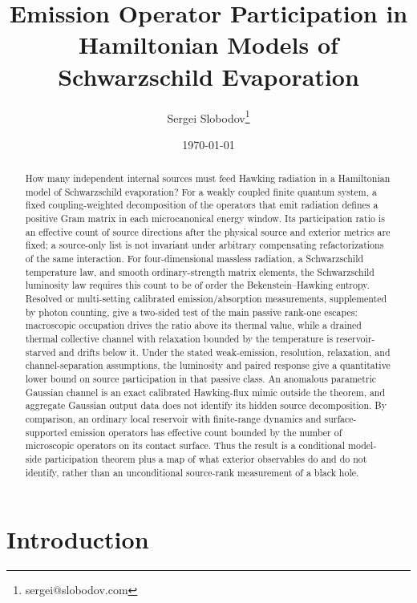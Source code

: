 \documentclass[12pt]{article}
\title{Emission Operator Participation in Hamiltonian Models of Schwarzschild Evaporation}
\author{Sergei Slobodov\thanks{sergei@slobodov.com}}
\date{\today}
\begin{document}
\begin{titlingpage}
\maketitle

\begin{abstract}
How many independent internal sources must feed Hawking radiation in a
Hamiltonian model of Schwarzschild evaporation?  For a weakly coupled
finite quantum system, a fixed coupling-weighted decomposition of the
operators that emit radiation defines a positive Gram matrix in each
microcanonical energy window.  Its participation ratio is an effective
count of source directions after the physical source and exterior
metrics are fixed; a source-only list is not invariant under arbitrary
compensating refactorizations of the same interaction.
For four-dimensional massless radiation, a Schwarzschild temperature
law, and smooth ordinary-strength matrix elements, the Schwarzschild
luminosity law requires this count to be of order the
Bekenstein--Hawking entropy.  Resolved or multi-setting calibrated
emission/absorption measurements, supplemented by photon counting, give
a two-sided test of the main passive rank-one escapes:
macroscopic occupation drives the ratio above its thermal value, while
a drained thermal collective channel with relaxation bounded by the
temperature is reservoir-starved and drifts below it.  Under the stated
weak-emission, resolution, relaxation, and channel-separation
assumptions, the luminosity and paired response give a quantitative lower bound on source
participation in that passive class.  An anomalous parametric Gaussian
channel is an exact calibrated Hawking-flux mimic outside the theorem,
and aggregate Gaussian output data does not identify its hidden source
decomposition.  By comparison, an ordinary local reservoir
with finite-range dynamics and surface-supported emission operators has
effective count bounded by the number of microscopic operators on its
contact surface.  Thus the result is a conditional model-side
participation theorem plus a map of what exterior observables do and do
not identify, rather than an unconditional source-rank measurement of a
black hole.
\end{abstract}
\end{titlingpage}

\section{Introduction}
\end{document}
